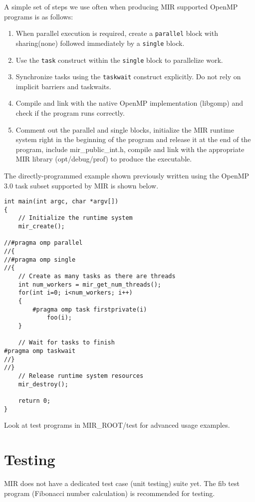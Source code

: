 \documentclass[11pt,a4paper,notitlepage]{article}
\begin{document}
A simple set of steps we use often when producing MIR supported OpenMP programs is as follows:
\begin{enumerate}
\item When parallel execution is required, create a \texttt{parallel} block  with sharing(none) followed immediately by a \texttt{single} block. 
\item Use the \texttt{task} construct within the \texttt{single} block to parallelize work. 
\item Synchronize tasks using the \texttt{taskwait} construct explicitly. Do not rely on implicit barriers and taskwaits.
\item Compile and link with the native OpenMP implementation (libgomp) and check if the program runs correctly. 
\item Comment out the parallel and single blocks, initialize the MIR runtime system right in the beginning of the program and release it at the end of the program, include mir\_public\_int.h, compile and link with the appropriate MIR library (opt/debug/prof) to produce the executable.
\end{enumerate}

The directly-programmed example shown previously written using the OpenMP 3.0 task subset supported by MIR is shown below.

\begin{lstlisting}[style=BashInputStyle]
int main(int argc, char *argv[])
{
    // Initialize the runtime system
    mir_create();

//#pragma omp parallel
//{
//#pragma omp single
//{
    // Create as many tasks as there are threads
    int num_workers = mir_get_num_threads();
    for(int i=0; i<num_workers; i++)
    {
        #pragma omp task firstprivate(i)
            foo(i);
    }
        
    // Wait for tasks to finish
#pragma omp taskwait
//}
//}
    // Release runtime system resources
    mir_destroy();

    return 0;
}
\end{lstlisting}

Look at test programs in MIR\_ROOT/test for advanced usage examples.

\section{Testing}
MIR does not have a dedicated test case (unit testing) suite yet. The fib test program (Fibonacci number calculation) is recommended for testing.
\end{document}
